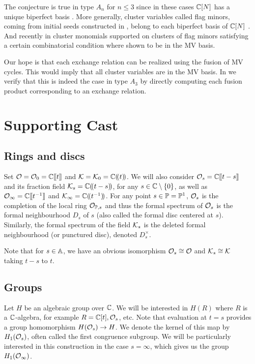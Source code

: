 \documentclass{article}
\begin{document}
The conjecture is true in type $A_n$ for $n\leq 3$ since in these cases $\CC[N]$ has a unique biperfect basis \cite[Section 2.3]{baumann2019mirkovic}.
% 
More generally, cluster variables called flag minors, coming from initial seeds constructed in \cite[Definitions~2.2--2.3]{berenstein2005cluster3}, belong to each biperfect basis of $\CC[N]$ \cite[Remark~2.10]{baumann2019mirkovic}. 
And recently in \cite[Proposition 7.2]{baumann2020bases} cluster monomials supported on clusters of flag minors satisfying a certain combinatorial condition where shown to be in the MV basis. 

Our hope is that each exchange relation can be realized using the fusion of MV cycles. This would imply that all cluster variables are in the MV basis. In  we verify that this is indeed the case in type $A_3$ by directly computing each fusion product corresponding to an exchange relation.

\section{Supporting Cast}
\label{s:players}
% 
\subsection{Rings and discs}
\label{ss:rings}
Set $\cO = \cO_0 = \CC\xt$ and $\cK = \cK_0 = \CC\xT$.
We will also consider $\cO_s = \CC\xt[t-s]$ and its fraction field $\cK_s=\CC\xT[t-s]$, for any $ s \in \CC\setminus\{0\} $, as well as $ \Oinf = \CC\xt[t^{-1}] $ and $\Kinf = \CC\xT[t^{-1}]$. For any point $ s \in \PP = \PP^1$, $ \cO_s$ is the completion of the local ring $ \mathcal O_{\PP, s} $ and thus the formal spectrum of $ \cO_s$ is the formal neighbourhood $ D_s$ of $ s $ (also called the formal disc centered at $ s$).  Similarly, the formal spectrum of the field $\cK_s$ is the deleted formal neighbourhood (or punctured disc), denoted $ D_s^\times$.

Note that for $ s \in \AA $, we have an obvious isomorphism  $\cO_s \cong \cO$ and $\cK_s\cong\cK$ taking $ t-s $ to $ t$. 
% 

\subsection{Groups}
\label{ss:groups}
% 
Let $H $ be an algebraic group over $ \CC $.  We will be interested in $ H(R)$ where $ R $ is a $\CC$-algebra, for example $R = \CC[t], \cO_s$, etc.  
% 
Note that evaluation at $ t = s$ provides a group homomorphism $ H(\cO_s) \rightarrow H$.  We denote the kernel of this map by $ H_1(\cO_s)$, often called the  first congruence subgroup.  We will be particularly interested in this construction in the case $ s = \infty$, which gives us the group $ H_1(\Oinf)$.
\end{document}
